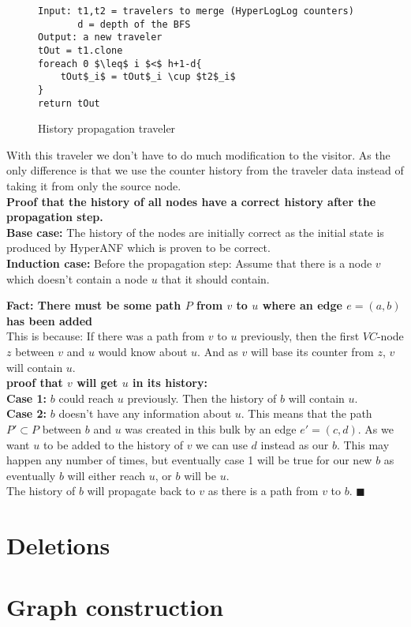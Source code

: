 \begin{figure}[h]
    \begin{lstlisting}[mathescape]
Input: t1,t2 = travelers to merge (HyperLogLog counters)
       d = depth of the BFS
Output: a new traveler
tOut = t1.clone
foreach 0 $\leq$ i $<$ h+1-d{
    tOut$_i$ = tOut$_i \cup $t2$_i$
}
return tOut
    \end{lstlisting}
    \caption{History propagation traveler}
    \label{fig:history_propagation_traveler}
\end{figure}

With this traveler we don't have to do much modification to the visitor. As the only difference is that we use the counter history from the traveler data instead of taking it from only the source node.\\

\noindent\textbf{Proof that the history of all nodes have a correct history after the propagation step.}\\

\noindent\textbf{Base case:} The history of the nodes are initially correct as the initial state is produced by HyperANF which is proven to be correct. \\

\noindent\textbf{Induction case:} Before the propagation step: Assume that there is a node $v$ which doesn't contain a node $u$ that it should contain. \\

\begin{addmargin}[2em]{0em}
    \noindent\textbf{Fact: There must be some path $P$ from $v$ to $u$ where an edge $e = (a,b)$ has been added}\\ 
    This is because: If there was a path from $v$ to $u$ previously, then the first $VC$-node $z$ between $v$ and $u$ would know about $u$. And as $v$ will base its counter from $z$, $v$ will contain $u$.\\
    
    \noindent\textbf{proof that $v$ will get $u$ in its history:}\\
    
    \noindent\textbf{Case 1:} 
    $b$ could reach $u$ previously. Then the history of $b$ will contain $u$.\\
    
    \noindent\textbf{Case 2:}
    $b$ doesn't have any information about $u$. This means that the path $P' \subset P$ between $b$ and $u$ was created in this bulk by an edge $e'=(c,d)$. As we want $u$ to be added to the history of $v$ we can use $d$ instead as our $b$. This may happen any number of times, but eventually case 1 will be true for our new $b$ as eventually $b$ will either reach $u$, or $b$ will be $u$.\\
    
    \noindent The history of $b$ will propagate back to $v$ as there is a path from $v$ to $b$. $\blacksquare$
\end{addmargin}



\section{Deletions}

\section{Graph construction}

